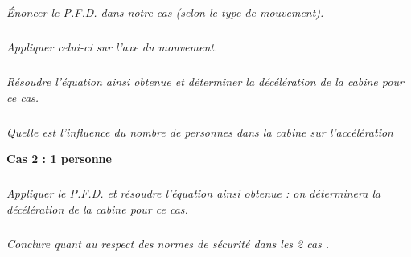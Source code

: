 \documentclass[10pt,fleqn]{book} %
\begin{document}
\begin{multicols}{2}
\begin{corrige}
\end{corrige}
\else
\fi

\subparagraph{}
\textit{Énoncer le P.F.D. dans notre cas (selon le type de mouvement).}
\ifprof
\begin{corrige}
\end{corrige}
\else
\fi

\subparagraph{}
\textit{Appliquer celui-ci sur l’axe du mouvement.}
\ifprof
\begin{corrige}
\end{corrige}
\else
\fi

\subparagraph{}
\textit{Résoudre l’équation ainsi obtenue et déterminer la décélération de la cabine pour ce cas.}
\ifprof
\begin{corrige}
\end{corrige}
\else
\fi


\subparagraph{}
\textit{Quelle est l'influence du nombre de personnes dans la cabine sur l'accélération }
\ifprof
\begin{corrige}
\end{corrige}
\else
\fi

\textbf{Cas 2 : 1 personne}

\subparagraph{}
\textit{Appliquer le P.F.D. et résoudre l’équation ainsi obtenue : on déterminera la décélération  de la cabine pour ce cas.}
\ifprof
\begin{corrige}
\end{corrige}
\else
\fi

\subparagraph{}
\textit{Conclure quant au respect des normes de sécurité dans les 2 cas .}
\ifprof
\begin{corrige}
\end{corrige}
\else
\fi

\end{multicols}
\end{document}
